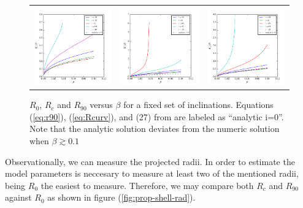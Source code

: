 \begin{figure}
\begin{tabular}{ccc}
\includegraphics[width=0.35\linewidth]{R0-b}&
\includegraphics[width=0.35\linewidth]{Rc-b} &
\includegraphics[width=0.35\linewidth]{R90-b}
\end{tabular}
\caption{$R_0$, $R_c$ and $R_{90}$ versus $\beta$ for a fixed set of inclinations. Equations (\ref{eq:r90}), (\ref{eq:Rcurv}), and (27) from \CRW{}
are labeled as ``analytic i=0''. Note that the analytic solution deviates from the numeric solution when $\beta \gtrsim 0.1$}
\label{fig:rad-beta}
\end{figure}

Observationally, we can measure the projected radii. In order to estimate the model parameters is neccesary to measure at least two of the mentioned radii, being $R_0$ the
easiest to measure. Therefore, we may compare both $R_c$ and $R_{90}$ against $R_0$ as shown in figure (\ref{fig:prop-shell-rad}). 

